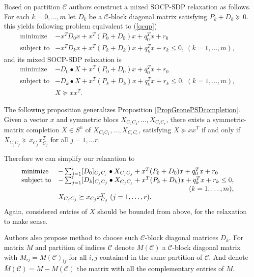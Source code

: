 \documentclass[12pt]{book}
\theoremstyle{definition}
\begin{document}
Based on partition $\mathcal{C}$ authors construct a mixed SOCP-SDP relaxation as follows. For each $k=0,\dots ,m$ let $D_k$ be a $\mathcal{C}$-block diagonal matrix satisfying $P_k + D_k \succeq 0.$
this yields following problem equivalent to (\ref{qcqp})
\begin{equation*}
\begin{array}{ll}
\mbox{minimize}& - x^TD_0x + x^T(P_0+D_0)x + q_0^Tx + r_0 \\
\mbox{subject to}& - x^TD_kx + x^T(P_k+D_k)x + q_k^Tx + r_k \leq 0, \  (k = 1,\dots ,m),
\end{array} 
\end{equation*}
and its mixed SOCP-SDP relaxation is 
\begin{equation*}
\begin{array}{ll}
\mbox{minimize}& - D_0\bullet X + x^T(P_0+D_0)x + q_0^Tx + r_0 \\
\mbox{subject to}& - D_k\bullet X + x^T(P_k+D_k)x  + q_k^Tx + r_k \leq 0, \  (k = 1,\dots ,m), \\
& X\succeq xx^T.
\end{array} 
\end{equation*}

The following proposition generalizes Proposition \ref{PropGronePSDcompletion}.
\prop [{[\ref{GronePSDcompletions}]}]
\label{PropGronePSDcompletion2} Given a vector $x$ and symmetric blocs $X_{C_1C_1},\dots ,X_{C_rC_r}$, there exists
a symmetric-matrix completion $X\in S^n$ of $X_{C_1C_1},\dots ,X_{C_rC_r}$, satisfying $X \succeq xx^T$ if and only if $X_{C_jC_j} \succeq x_{C_j}x_{C_j}^T$ for all $j = 1,\dots r.$ \rm 

Therefore we can simplify our relaxation to 
\begin{equation}
\label{InBetweenCBlockRelax}
\begin{array}{ll}
\mbox{minimize}& - \sum_{j=1}^r [D_0]_{C_jC_j}\bullet X_{C_jC_j} + x^T(P_0+D_0)x + q_0^Tx + r_0 \\
\mbox{subject to}& - \sum_{j=1}^r [D_k]_{C_jC_j}\bullet X_{C_jC_j}+ x^T(P_k+D_k)x  + q_k^Tx + r_k \leq 0,\\  & \hfill (k = 1,\dots ,m), \\
& X_{C_jC_j}\succeq x_{C_j}x_{C_j}^T \ (j=1,\dots ,r).
\end{array} 
\end{equation}
Again, considered entries of $X$ should be bounded from above, for the relaxation to make sense.

Authors also propose method to choose such $\mathcal{C}$-block diagonal matrices $D_k$.  For matrix $M$ and partition of indices $\mathcal{C}$ denote $M(\mathcal{C})$ a $\mathcal{C}$-block diagonal matrix with $M_{ij} = M(\mathcal{C})_{ij}$ for all $i,j$ contained in the same partition of $\mathcal{C}$. And denote $\bar{M}(\mathcal{C}) = M-M(\mathcal{C})$ the matrix with all the complementary entries of $M$.
\end{document}
